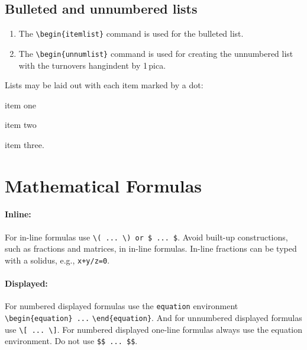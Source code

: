 \subsection{Bulleted and unnumbered lists}

\begin{enumerate}
\item[] The \verb|\begin{itemlist}| command is used for the bulleted list.

\smallskip

\item[] The \verb|\begin{unnumlist}| command is used for creating the
  unnumbered list with the turnovers hangindent by 1\,pica.
\end{enumerate}

Lists may be laid out with each item marked by a dot:

\begin{itemlist}
\item item one
\item item two
\item item three.
\end{itemlist}

\section{Mathematical Formulas}
\paragraph{Inline:}
For in-line formulas use \verb|\( ... \) or $ ... $|. Avoid built-up
constructions, such as fractions and matrices, in in-line
formulas. In-line fractions can be typed with a solidus, e.g.,
\verb|x+y/z=0|.

\paragraph{Displayed:}
For numbered displayed formulas use the \verb|equation| environment
\verb|\begin{equation} ...| \verb|\end{equation}|.
And for unnumbered displayed formulas use \verb|\[ ... \]|. For
numbered displayed one-line formulas always use the equation
environment. Do not use \verb|$$ ... $$|.

\eject

